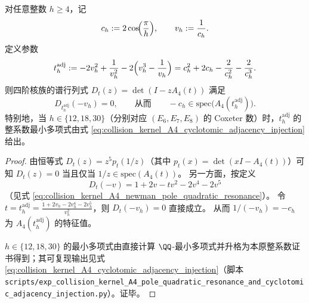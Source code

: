 %
%

\begin{proposition}\label{prop:pom-a4t-cyclotomic-adjacency-injection}
对任意整数 \(h\ge 4\)，记
\[
c_h:=2\cos\!\Bigl(\frac{\pi}{h}\Bigr),\qquad v_h:=\frac{1}{c_h}.
\]
定义参数
\[
t_h^{\mathrm{adj}}
:=-2v_h^2+\frac{1}{v_h^2}-2\Bigl(v_h^3-\frac{1}{v_h}\Bigr)
=c_h^2+2c_h-\frac{2}{c_h^2}-\frac{2}{c_h^3}.
\]
则四阶核族的谱行列式 \(D_t(z)=\det(I-zA_4(t))\) 满足
\[
D_{t_h^{\mathrm{adj}}}(-v_h)=0,
\qquad\text{从而}\qquad
-c_h\in\mathrm{spec}\bigl(A_4(t_h^{\mathrm{adj}})\bigr).
\]
特别地，当 \(h\in\{12,18,30\}\)（分别对应 \((E_6,E_7,E_8)\) 的 Coxeter 数）时，\(t_h^{\mathrm{adj}}\) 的整系数最小多项式由式 \eqref{eq:collision_kernel_A4_cyclotomic_adjacency_injection} 给出。
\end{proposition}
\begin{proof}
由恒等式 \(D_t(z)=z^5p_t(1/z)\)（其中 \(p_t(x)=\det(xI-A_4(t))\)）可知 \(D_t(z)=0\) 当且仅当 \(1/z\in\mathrm{spec}(A_4(t))\)。
另一方面，按定义
\[
D_t(-v)=1+2v-tv^2-2v^4-2v^5
\]
（见式 \eqref{eq:collision_kernel_A4_newman_pole_quadratic_resonance}）。
令 \(t=t_h^{\mathrm{adj}}=\frac{1+2v_h-2v_h^4-2v_h^5}{v_h^2}\)，则 \(D_t(-v_h)=0\) 直接成立。
从而 \(1/(-v_h)=-c_h\) 为 \(A_4(t_h^{\mathrm{adj}})\) 的特征值。
\par
\(h\in\{12,18,30\}\) 的最小多项式由直接计算 \(\QQ\)-最小多项式并升格为本原整系数证书得到；其可复现输出见式 \eqref{eq:collision_kernel_A4_cyclotomic_adjacency_injection}（脚本 \texttt{scripts/exp\_collision\_kernel\_A4\_pole\_quadratic\_resonance\_and\_cyclotomic\_adjacency\_injection.py}）。证毕。
\end{proof}



